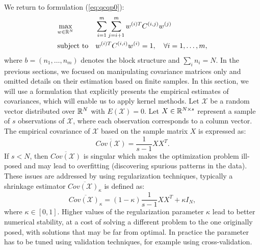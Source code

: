We return to formulation (\ref{eq:qcqp0}):
\begin{equation*}
\begin{aligned}
& \underset{w \in \mathbb{R}^N}{\text{max}}
& & \sum_{i = 1}^m \sum_{j = i+1 }^m w^{(i)T} C^{(i,j)} w^{(j)}\\
& \text{subject to}
& &w^{(i)T} C^{(i,i)} w^{(i)} = 1, \quad\forall i = 1,\ldots, m,
\end{aligned}
\end{equation*}
where $b = \left(n_1,\ldots,n_m\right)$ denotes the block structure
and $ \sum_i n_i = N $.
In the previous sections, we focused on manipulating covariance matrices
only and omitted details on their estimation based on finite samples.
In this section, we will use a formulation that explicitly presents
the empirical estimates of covariances, which will enable us to apply kernel methods.
Let $\mathcal{X}$ be a random vector distributed over $\mathbb{R}^N$ with
$E\left(\mathcal{X}\right) = 0$. Let $X \in \mathbb{R}^{N \times s}$
represent a sample of $s$ observations of $\mathcal{X}$, where each
observation corresponds to a column vector. The empirical covariance of $\mathcal{X}$
based on the sample matrix $X$ is expressed as:
$$ \overline{Cov\left(\mathcal{X}\right)} = \frac{1}{s - 1}X X^T.$$
If $s < N$, then $\overline{Cov\left(\mathcal{X}\right)}$ is singular which
makes the optimization problem ill-posed and may lead to overfitting
(discovering spurious patterns in the data). These issues are addressed by
using regularization techniques, typically a shrinkage estimator
$\overline{Cov\left(\mathcal{X}\right)_{\kappa}}$ is defined as:
$$ \overline{Cov\left(\mathcal{X}\right)_{\kappa}} = \left(1-\kappa\right)
 \frac{1}{s - 1}X X^T + \kappa  I_N,$$ where $\kappa \in \left[0,1\right]$.
Higher values of the regularization parameter $\kappa$ lead to better numerical stability,
at a cost of solving a different problem to the one originally posed, with solutions
that may be far from optimal. In practice the parameter has to be tuned using validation
techniques, for example using cross-validation.



